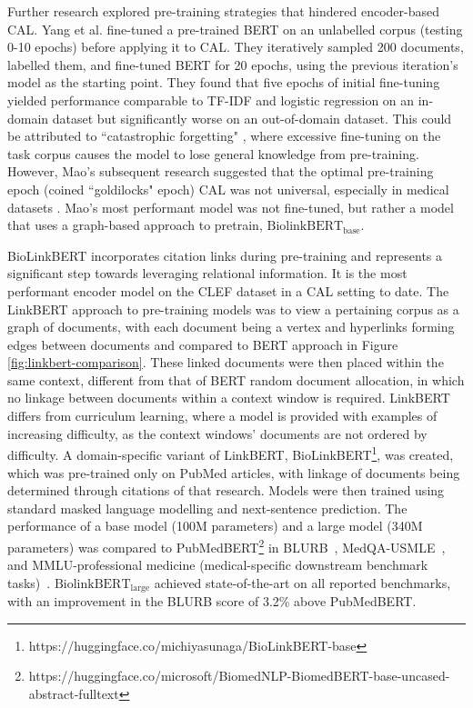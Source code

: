 \documentclass[10pt,oneside]{book}
\begin{document}
Further research explored pre-training strategies that hindered encoder-based CAL. Yang et al. \cite{yang_goldilocks_2022} fine-tuned a pre-trained BERT on an unlabelled corpus (testing 0-10 epochs) before applying it to CAL. They iteratively sampled 200 documents, labelled them, and fine-tuned BERT for 20 epochs, using the previous iteration's model as the starting point. They found that five epochs of initial fine-tuning yielded performance comparable to TF-IDF and logistic regression on an in-domain dataset but significantly worse on an out-of-domain dataset. This could be attributed to ``catastrophic forgetting" \cite{xu_forget_2020}, where excessive fine-tuning on the task corpus causes the model to lose general knowledge from pre-training. However, Mao's subsequent research suggested that the optimal pre-training epoch (coined ``goldilocks" epoch) CAL was not universal, especially in medical datasets \cite{mao_reproducibility_2024}. Mao's most performant model was not fine-tuned, but rather a model that uses a graph-based approach to pretrain, ${\text{BiolinkBERT}}_{\text{base}}$.

BioLinkBERT incorporates citation links during pre-training and represents a significant step towards leveraging relational information. It is the most performant encoder model on the CLEF dataset in a CAL setting to date. The LinkBERT approach to pre-training models was to view a pertaining corpus as a graph of documents, with each document being a vertex and hyperlinks forming edges between documents \cite{yasunaga_linkbert_2022} and compared to BERT approach in Figure \ref{fig:linkbert-comparison}. These linked documents were then placed within the same context, different from that of BERT random document allocation, in which no linkage between documents within a context window is required. LinkBERT differs from curriculum learning, where a model is provided with examples of increasing difficulty, as the context windows' documents are not ordered by difficulty. A domain-specific variant of LinkBERT, BioLinkBERT\footnote{https://huggingface.co/michiyasunaga/BioLinkBERT-base}, was created, which was pre-trained only on PubMed articles, with linkage of documents being determined through citations of that research. Models were then trained using standard masked language modelling and next-sentence prediction. The performance of a base model (100M parameters) and a large model (340M parameters) was compared to PubMedBERT\footnote{https://huggingface.co/microsoft/BiomedNLP-BiomedBERT-base-uncased-abstract-fulltext} in BLURB~\cite{gu_domain-specific_2021}, MedQA-USMLE~\cite{jin_what_2021}, and MMLU-professional medicine (medical-specific downstream benchmark tasks)~\cite{hendrycks_measuring_2021}. ${\text{BiolinkBERT}}_{\text{large}}$ achieved state-of-the-art on all reported benchmarks, with an improvement in the BLURB score of 3.2\% above PubMedBERT.
\end{document}
